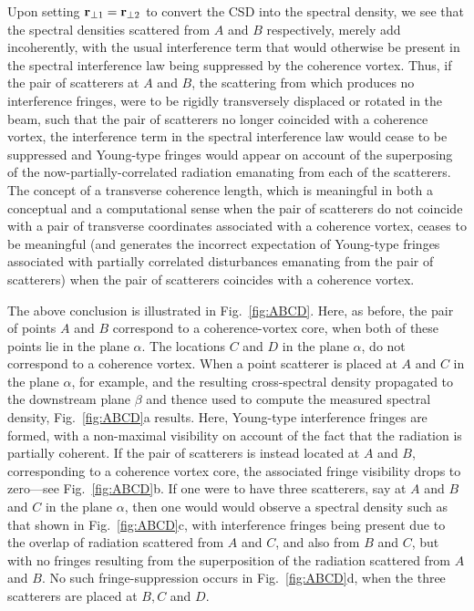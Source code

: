 \documentclass{iucr}              %
\newcommand{\inblue}[1]{{\color{blue}#1}}
\begin{document}
Upon setting ${\bf r}_{\perp 1}={\bf r}_{\perp 2}$ to convert the CSD into the spectral density, we see that the spectral densities scattered from $A$ and $B$ respectively, merely add incoherently, with the usual interference term that would otherwise be present in the spectral interference law \cite{mandel_wolf} being suppressed by the coherence vortex.  Thus, if the pair of scatterers at $A$ and $B$, the scattering from which produces no interference fringes, were to be rigidly transversely displaced or rotated in the beam, such that the pair of scatterers no longer coincided with a coherence vortex, the interference term in the spectral interference law would cease to be suppressed and Young-type fringes would appear on account of the superposing of the now-partially-correlated radiation emanating from each of the scatterers.  The concept of a transverse coherence length, which is meaningful in both a conceptual and a computational sense when the pair of scatterers do not coincide with a pair of transverse coordinates associated with a coherence vortex, ceases to be meaningful (and generates the incorrect expectation of Young-type fringes associated with partially correlated disturbances emanating from the pair of scatterers) when the pair of scatterers coincides with a coherence vortex.     

The above conclusion is illustrated in \inblue{Fig.~\ref{fig:ABCD}}.  Here, as before, the pair of points $A$ and $B$ correspond to a coherence-vortex core, when both of these points lie in the plane $\alpha$. The locations $C$ and $D$ in the plane $\alpha$, do not correspond to a coherence vortex.  When a point scatterer is placed at $A$ and $C$ in the plane $\alpha$, for example, and the resulting cross-spectral density propagated to the downstream plane $\beta$ and thence used to compute the measured spectral density, \inblue{Fig.~\ref{fig:ABCD}a} results.  Here, Young-type interference fringes are formed, with a non-maximal visibility on account of the fact that the radiation is partially coherent.  If the pair of scatterers is instead located at $A$ and $B$, corresponding to a coherence vortex core, the associated fringe visibility drops to zero---see \inblue{Fig.~\ref{fig:ABCD}b}.  If one were to have three scatterers, say at $A$ and $B$ and $C$ in the plane $\alpha$, then one would would observe a spectral density such as that shown in \inblue{Fig.~\ref{fig:ABCD}c}, with interference fringes being present due to the overlap of radiation scattered from $A$ and $C$, and also from $B$ and $C$, but with no fringes resulting from the superposition of the radiation scattered from $A$ and $B$. No such fringe-suppression occurs in \inblue{Fig.~\ref{fig:ABCD}d}, when the three scatterers are placed at $B,C$ and $D$. 
\end{document}
